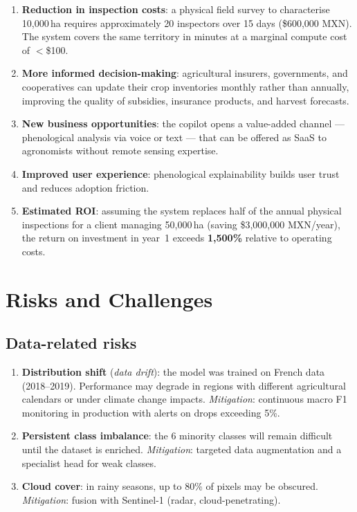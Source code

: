 \documentclass{article}
\begin{document}
\begin{enumerate}[leftmargin=*]
    \item \textbf{Reduction in inspection costs}: a physical field survey
    to characterise 10,000\,ha requires approximately 20 inspectors over
    15 days (\$600,000 MXN). The system covers the same territory in
    minutes at a marginal compute cost of $<$\$100.

    \item \textbf{More informed decision-making}: agricultural insurers,
    governments, and cooperatives can update their crop inventories monthly
    rather than annually, improving the quality of subsidies, insurance
    products, and harvest forecasts.

    \item \textbf{New business opportunities}: the copilot opens a
    value-added channel --- phenological analysis via voice or text --- that
    can be offered as SaaS to agronomists without remote sensing expertise.

    \item \textbf{Improved user experience}: phenological explainability
    builds user trust and reduces adoption friction.

    \item \textbf{Estimated ROI}: assuming the system replaces half of
    the annual physical inspections for a client managing 50,000\,ha
    (saving \$3,000,000 MXN/year), the return on investment in year~1
    exceeds \textbf{1,500\%} relative to operating costs.
\end{enumerate}

\section{Risks and Challenges}

\subsection{Data-related risks}

\begin{enumerate}[leftmargin=*]
    \item \textbf{Distribution shift} (\textit{data drift}): the model
    was trained on French data (2018--2019). Performance may degrade in
    regions with different agricultural calendars or under climate change
    impacts. \textit{Mitigation}: continuous macro F1 monitoring in
    production with alerts on drops exceeding 5\%.

    \item \textbf{Persistent class imbalance}: the 6 minority classes
    will remain difficult until the dataset is enriched. \textit{Mitigation}:
    targeted data augmentation and a specialist head for weak classes.

    \item \textbf{Cloud cover}: in rainy seasons, up to 80\% of pixels
    may be obscured. \textit{Mitigation}: fusion with Sentinel-1 (radar,
    cloud-penetrating).
\end{enumerate}
\end{document}
